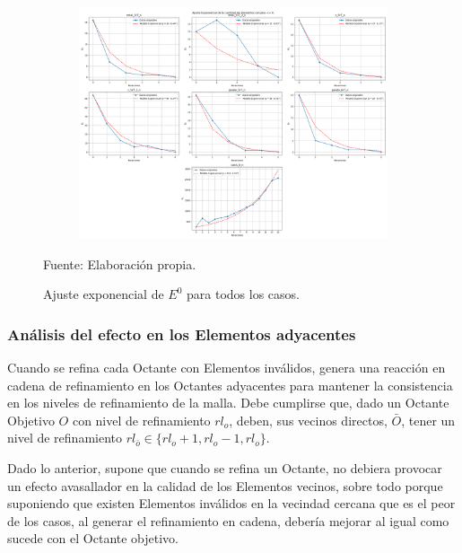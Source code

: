 \begin{itemize}
	\begin{figure}[!ht]
		\centering
		\begin{subfigure}[t]{1.0\textwidth}
			\includegraphics[width=0.75\paperheight, angle=90, origin=c]{figures/analysis/fit_all.png}
		\end{subfigure}
		\caption{ Ajuste exponencial de $E^0$ para todos los casos. }
		Fuente: Elaboración propia.
		\label{fig:exponential_fit_all}
	\end{figure}

\end{itemize}



\subsubsection{ Análisis del efecto en los Elementos adyacentes }

Cuando se refina cada Octante con Elementos inválidos, genera una reacción en cadena de refinamiento en los Octantes adyacentes para mantener la consistencia en los niveles de refinamiento de la malla. Debe cumplirse que, dado un Octante Objetivo $O$ con nivel de refinamiento $rl_o$, deben, sus vecinos directos, $\bar{O}$, tener un nivel de refinamiento $rl_{\bar{o}} \in \{rl_o + 1, rl_o - 1, rl_o\}$.

Dado lo anterior, supone que cuando se refina un Octante, no debiera provocar un efecto avasallador en la calidad de los Elementos vecinos, sobre todo porque suponiendo que existen Elementos inválidos en la vecindad cercana que es el peor de los casos, al generar el refinamiento en cadena, debería mejorar al igual como sucede con el Octante objetivo. 

